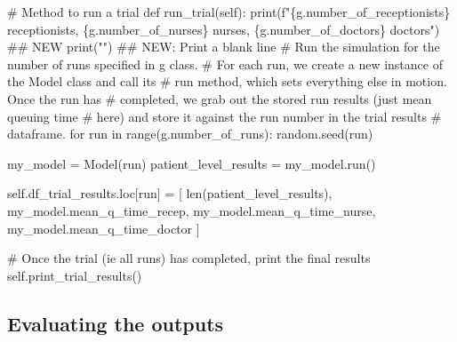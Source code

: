 \documentclass[
  letterpaper,
  DIV=11,
  numbers=noendperiod]{scrreprt}
\newenvironment{Shaded}{}{}
\newcommand{\BuiltInTok}[1]{\textcolor[rgb]{0.84,0.23,0.29}{#1}}
\newcommand{\CommentTok}[1]{\textcolor[rgb]{0.42,0.45,0.49}{#1}}
\newcommand{\ControlFlowTok}[1]{\textcolor[rgb]{0.84,0.23,0.29}{#1}}
\newcommand{\KeywordTok}[1]{\textcolor[rgb]{0.84,0.23,0.29}{#1}}
\newcommand{\NormalTok}[1]{\textcolor[rgb]{0.14,0.16,0.18}{#1}}
\newcommand{\OperatorTok}[1]{\textcolor[rgb]{0.14,0.16,0.18}{#1}}
\newcommand{\SpecialCharTok}[1]{\textcolor[rgb]{0.00,0.36,0.77}{#1}}
\newcommand{\SpecialStringTok}[1]{\textcolor[rgb]{0.01,0.18,0.38}{#1}}
\newcommand{\StringTok}[1]{\textcolor[rgb]{0.01,0.18,0.38}{#1}}
\newcommand{\VariableTok}[1]{\textcolor[rgb]{0.89,0.38,0.04}{#1}}
\begin{document}
\begin{tcolorbox}
\begin{Shaded}
\begin{Highlighting}[]
    \CommentTok{\# Method to run a trial}
    \KeywordTok{def}\NormalTok{ run\_trial(}\VariableTok{self}\NormalTok{):}
        \BuiltInTok{print}\NormalTok{(}\SpecialStringTok{f"}\SpecialCharTok{\{}\NormalTok{g}\SpecialCharTok{.}\NormalTok{number\_of\_receptionists}\SpecialCharTok{\}}\SpecialStringTok{ receptionists, }\SpecialCharTok{\{}\NormalTok{g}\SpecialCharTok{.}\NormalTok{number\_of\_nurses}\SpecialCharTok{\}}\SpecialStringTok{ nurses, }\SpecialCharTok{\{}\NormalTok{g}\SpecialCharTok{.}\NormalTok{number\_of\_doctors}\SpecialCharTok{\}}\SpecialStringTok{ doctors"}\NormalTok{) }\CommentTok{\#\# NEW}
        \BuiltInTok{print}\NormalTok{(}\StringTok{""}\NormalTok{) }\CommentTok{\#\# NEW: Print a blank line}
        \CommentTok{\# Run the simulation for the number of runs specified in g class.}
        \CommentTok{\# For each run, we create a new instance of the Model class and call its}
        \CommentTok{\# run method, which sets everything else in motion.  Once the run has}
        \CommentTok{\# completed, we grab out the stored run results (just mean queuing time}
        \CommentTok{\# here) and store it against the run number in the trial results}
        \CommentTok{\# dataframe.}
        \ControlFlowTok{for}\NormalTok{ run }\KeywordTok{in} \BuiltInTok{range}\NormalTok{(g.number\_of\_runs):}
\NormalTok{            random.seed(run)}

\NormalTok{            my\_model }\OperatorTok{=}\NormalTok{ Model(run)}
\NormalTok{            patient\_level\_results }\OperatorTok{=}\NormalTok{ my\_model.run()}

            \VariableTok{self}\NormalTok{.df\_trial\_results.loc[run] }\OperatorTok{=}\NormalTok{ [}
                \BuiltInTok{len}\NormalTok{(patient\_level\_results),}
\NormalTok{                my\_model.mean\_q\_time\_recep,}
\NormalTok{                my\_model.mean\_q\_time\_nurse,}
\NormalTok{                my\_model.mean\_q\_time\_doctor}
\NormalTok{                ]}

        \CommentTok{\# Once the trial (ie all runs) has completed, print the final results}
        \VariableTok{self}\NormalTok{.print\_trial\_results()}
\end{Highlighting}
\end{Shaded}

\end{tcolorbox}

\subsection{Evaluating the outputs}\label{evaluating-the-outputs-4}
\end{document}
